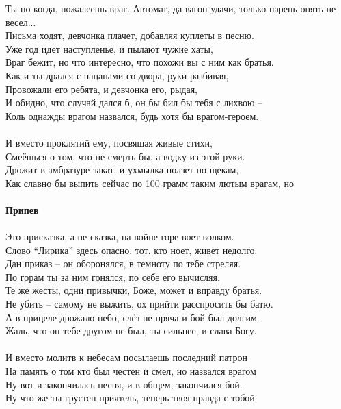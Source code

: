 \documentclass[fleqn,a5paper,12pt,twoside]{guitartabs}
\begin{document}
    \-\hspace{10mm}Ты по когда, пожалеешь враг.
    \newpage
    Автомат, да вагон удачи, только парень опять не весел...\\
    Письма ходят, девчонка плачет, добавляя куплеты в песню.\\
    Уже год идет наступленье, и пылают чужие хаты,\\
    Враг бежит, но что интересно, что похожи вы с ним как братья.\\
    Как и ты дрался с пацанами со двора, руки разбивая,\\
    Провожали его ребята, и девчонка его, рыдая,\\
    И обидно, что случай дался б, он бы бил бы тебя с лихвою --\\
    Коль однажды врагом назвался, будь хотя бы врагом-героем.\\
    \\
    И вместо проклятий ему, посвящая живые стихи,\\
    Смеёшься о том, что не смерть бы, а водку из этой руки.\\
    Дрожит в амбразуре закат, и ухмылка ползет по щекам,\\
    Как славно бы выпить сейчас по 100 грамм таким лютым врагам, но\\
    \\
    \-\hspace{10mm}\textbf{Припев}\\
    \\
    Это присказка, а не сказка, на войне горе воет волком.\\
    Слово ``Лирика'' здесь опасно, тот, кто ноет, живет недолго.\\
    Дан приказ -- он оборонялся, в темноту по тебе стреляя.\\
    По горам ты за ним гонялся, по себе его вычисляя.\\
    Те же жесты, одни привычки, Боже, может и вправду братья.\\
    Не убить -- самому не выжить, ох прийти расспросить бы батю.\\
    А в прицеле дрожало небо, слёз не пряча и бой был долгим.\\
    Жаль, что он тебе другом не был, ты сильнее, и слава Богу.\\
    \\
    И вместо молитв к небесам посылаешь последний патрон\\
    На память о том кто был честен и смел, но назвался врагом\\
    Ну вот и закончилась песня, и в общем, закончился бой.\\
    Ну что же ты грустен приятель, теперь твоя правда с тобой\\
    
\end{document}
